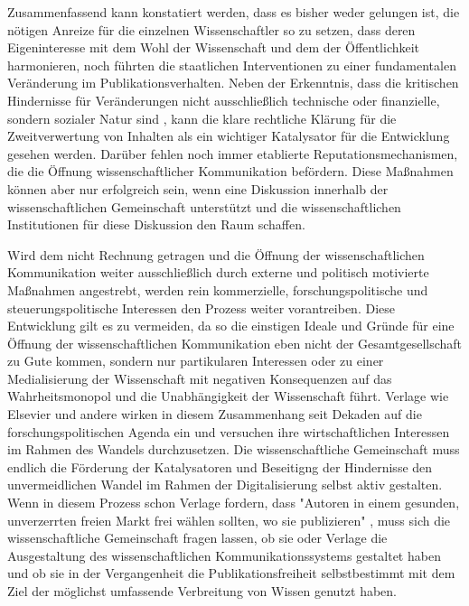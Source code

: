 Zusammenfassend kann konstatiert werden, dass es bisher weder gelungen ist, die nötigen Anreize für die einzelnen Wissenschaftler so zu setzen, dass deren Eigeninteresse mit dem Wohl der Wissenschaft und dem der Öffentlichkeit harmonieren, noch führten die staatlichen Interventionen zu einer fundamentalen Veränderung im Publikationsverhalten. Neben der Erkenntnis, dass die kritischen Hindernisse für Veränderungen nicht ausschließlich technische oder finanzielle, sondern sozialer Natur sind \cite{nosek_2012_scientific}, kann die klare rechtliche Klärung für die Zweitverwertung von Inhalten als ein wichtiger Katalysator für die Entwicklung gesehen werden. Darüber fehlen noch immer etablierte Reputationsmechanismen, die die Öffnung wissenschaftlicher Kommunikation befördern. Diese Maßnahmen können aber nur erfolgreich sein, wenn eine Diskussion innerhalb der wissenschaftlichen Gemeinschaft unterstützt und die wissenschaftlichen Institutionen für diese Diskussion den Raum schaffen.

Wird dem nicht Rechnung getragen und die Öffnung der wissenschaftlichen Kommunikation weiter ausschließlich durch externe und politisch motivierte Maßnahmen angestrebt, werden rein kommerzielle, forschungspolitische und steuerungspolitische Interessen den Prozess weiter vorantreiben. Diese Entwicklung gilt es zu vermeiden, da so die einstigen Ideale und Gründe für eine Öffnung der wissenschaftlichen Kommunikation eben nicht der Gesamtgesellschaft zu Gute kommen, sondern nur partikularen Interessen oder zu einer Medialisierung der Wissenschaft mit negativen Konsequenzen auf das Wahrheitsmonopol und die Unabhängigkeit der Wissenschaft führt. Verlage wie Elsevier und andere wirken in diesem Zusammenhang seit Dekaden auf die forschungspolitischen Agenda ein und versuchen ihre wirtschaftlichen Interessen im Rahmen des Wandels durchzusetzen. Die wissenschaftliche Gemeinschaft muss endlich die Förderung der Katalysatoren und Beseitigng der Hindernisse den unvermeidlichen Wandel im Rahmen der Digitalisierung selbst aktiv gestalten. Wenn in diesem Prozess schon Verlage fordern, dass "Autoren in einem gesunden, unverzerrten freien Markt frei wählen sollten, wo sie publizieren" \cite{Brussels_Declaration_2007}, muss sich die wissenschaftliche Gemeinschaft fragen lassen, ob sie oder Verlage die Ausgestaltung des wissenschaftlichen Kommunikationssystems gestaltet haben und ob sie in der Vergangenheit die Publikationsfreiheit selbstbestimmt mit dem Ziel der möglichst umfassende Verbreitung von Wissen genutzt haben.

